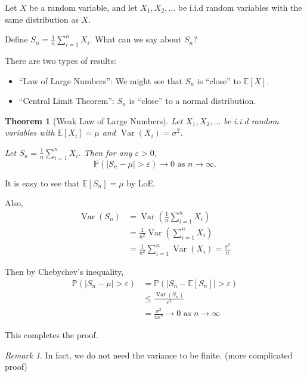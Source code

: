 \documentclass[a4paper,11pt]{amsbook}
\makeatletter
\renewenvironment{proof}[1][\proofname]{\par
    \pushQED{\qed}%
    \normalfont \topsep6\p@\@plus6\p@\relax
    \trivlist
    \itemindent\z@ %
    \item[\hskip\labelsep
          \scshape
      #1\@addpunct{.}]\ignorespaces
}{%
    \popQED\endtrivlist\@endpefalse
}
\newtheorem{theorem}{\hspace{-2em} \color{darkblue} Theorem}[chapter]
\theoremstyle{definition}
\theoremstyle{remark}
\newtheorem{remark}{\hspace{-2em} \color{darkblue} Remark}[chapter]
\newcommand{\E}{\mathbb{E}}
\renewcommand{\P}{\mathbb{P}}
\DeclareMathOperator\Var{Var}
\newcommand\0{\varnothing}
\makeatother
\begin{document}
Let $X$ be a random variable, 
and let $X_1,X_2,\ldots$ be i.i.d random variables with the same distribution as $X$.

Define $S_n=\frac{1}{n}\sum_{i=1}^nX_i$. What can we say about $S_n$?

There are two types of results: \begin{itemize}
    \item ``Law of Large Numbers'':
    We might see that $S_n$ is ``close'' to $\E[X]$.
    \item ``Central Limit Theorem'':
    $S_n$ is ``close'' to a normal distribution.
\end{itemize}

\begin{theorem}[Weak Law of Large Numbers]
    Let $X_1,X_2,\ldots$ be i.i.d random variables with $\E[X_i]=\mu$ and $\Var(X_i)=\sigma^2$.

    Let $S_n=\frac{1}{n}\sum_{i=1}^nX_i$.
    Then for any $\varepsilon>0$,
    $$\P\left(\left|S_n-\mu\right|>\varepsilon\right)\to0\text{ as }n\to\infty.$$
\end{theorem}
\begin{proof}
    It is easy to see that $\E[S_n]=\mu$ by LoE.

    Also, \begin{align*}
        \Var(S_n)&=\Var\left(\frac{1}{n}\sum_{i=1}^nX_i\right) \\
        &=\frac{1}{n^2}\Var\left(\sum_{i=1}^nX_i\right) \\
        &=\frac{1}{n^2}\sum_{i=1}^n\Var\left(X_i\right)=\frac{\sigma^2}{n}
    \end{align*}

    Then by Chebychev's inequality,
    \begin{align*}
        \P\left(\left|S_n-\mu\right|>\varepsilon\right)&=\P\left(\left|S_n-\E[S_n]\right|>\varepsilon\right) \\
        &\leq\frac{\Var(S_n)}{\varepsilon^2} \\
        &=\frac{\sigma^2}{n\varepsilon^2}\to0\text{ as }n\to\infty
    \end{align*}

    This completes the proof.
\end{proof}

\begin{remark}
    In fact, we do not need the variance to be finite. (more complicated proof)
\end{remark}
\end{document}
